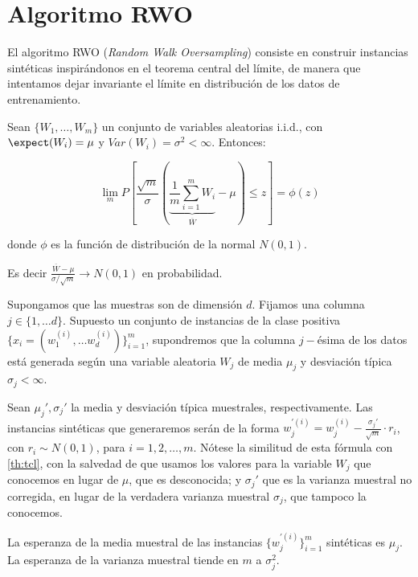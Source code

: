 \section{Algoritmo RWO}
El algoritmo RWO (\textit{Random Walk Oversampling}) consiste en construir instancias sintéticas inspirándonos
en el teorema central del límite, de manera que intentamos dejar invariante el límite en distribución de los
datos de entrenamiento.

\begin{theorem}
 Sean $\{W_1, \ldots, W_m\}$ un conjunto de variables aleatorias i.i.d., con $\expect(W_i) = \mu$ y 
 $Var(W_i) = \sigma^2 < \infty$. Entonces:
 
 \[\lim_{m} P\left[\frac{\sqrt{m}}{\sigma} \left(\underbrace{\frac{1}{m}\sum_{i=1}^m W_i}_{\overline{W}} - 
   \mu \right) \le z \right] = \phi(z)\]
 
 donde $\phi$ es la función de distribución de la normal $N(0,1)$.
 
 Es decir $\frac{\overline{W} - \mu}{\sigma/\sqrt{m}} \rightarrow N(0,1)$ en probabilidad.
 
 \label{th:tcl}
\end{theorem}

Supongamos que las muestras son de dimensión $d$. Fijamos una columna $j\in \{1, \ldots d\}$. Supuesto un
conjunto de instancias de la clase positiva $\{x_i=(w_1^{(i)}, \ldots w_d^{(i)})\}_{i=1}^m$, supondremos que la
columna $j-$ésima de los datos está generada según una variable aleatoria $W_j$ de media $\mu_j$ y desviación
típica $\sigma_j < \infty$.

Sean $\mu_j', \sigma_j'$ la media y desviación típica muestrales, respectivamente. Las instancias sintéticas 
que generaremos serán de la forma $w_j^{'(i)} = w_j^{(i)} - \frac{\sigma_j'}{\sqrt{m}} \cdot r_i$, con 
$r_i\sim N(0,1)$, para $i=1, 2, \ldots, m$. Nótese la similitud de esta fórmula con \ref{th:tcl}, con la salvedad
de que usamos los valores para la variable $W_j$ que conocemos en lugar de $\mu$, que es desconocida; y 
$\sigma_j'$ que es la varianza muestral no corregida, en lugar de la verdadera varianza muestral $\sigma_j$, 
que tampoco la conocemos.

\begin{theorem}
 La esperanza de la media muestral de las instancias $\{w_j^{'(i)}\}_{i=1}^m$ sintéticas es $\mu_j$. 
 La esperanza de la varianza muestral tiende en $m$ a $\sigma_j^2$.
\end{theorem}


